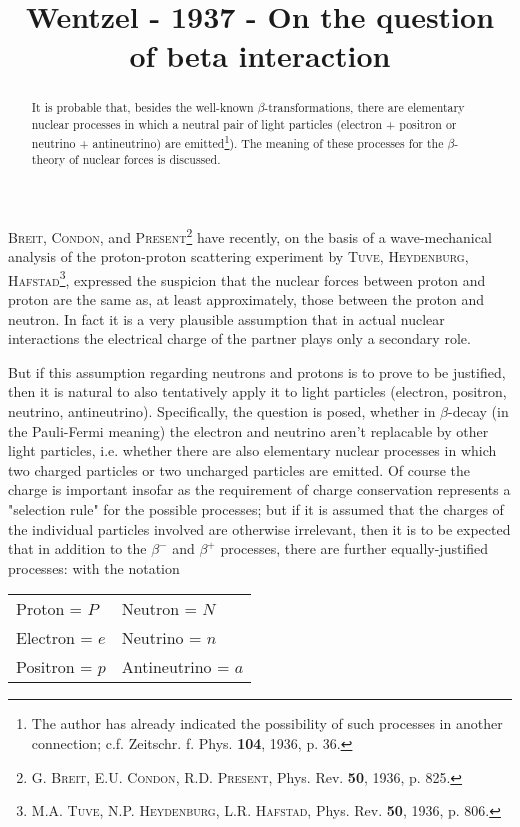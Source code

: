 \documentclass{article}
\title{Wentzel - 1937 - On the question of beta interaction}
\begin{document}
\begin{abstract}
It is probable that, besides the well-known $\beta$-transformations, there are elementary nuclear processes in which a neutral pair of light particles (electron + positron or neutrino + antineutrino) are emitted\footnote{The author has already indicated the possibility of such processes in another connection; c.f. Zeitschr. f. Phys. \textbf{104}, 1936, p. 36.}). The meaning of these processes for the $\beta$-theory of nuclear forces is discussed.
\end{abstract}

\textsc{Breit}, \textsc{Condon}, and \textsc{Present}\footnote{\textsc{G. Breit}, \textsc{E.U. Condon}, \textsc{R.D. Present}, Phys. Rev. \textbf{50}, 1936, p. 825.} have recently, on the basis of a wave-mechanical analysis of the proton-proton scattering experiment by \textsc{Tuve}, \textsc{Heydenburg}, \textsc{Hafstad}\footnote{\textsc{M.A. Tuve}, \textsc{N.P. Heydenburg}, \textsc{L.R. Hafstad}, Phys. Rev. \textbf{50}, 1936, p. 806.}, expressed the suspicion that the nuclear forces between proton and proton are the same as, at least approximately, those between the proton and neutron. In fact it is a very plausible assumption that in actual nuclear interactions the electrical charge of the partner plays only a secondary role.

But if this assumption regarding neutrons and protons is to prove to be justified, then it is natural to also tentatively apply it to light particles (electron, positron, neutrino, antineutrino). Specifically, the question is posed, whether in $\beta$-decay (in the Pauli-Fermi meaning) the electron and neutrino aren't replacable by other light particles, i.e. whether there are also elementary nuclear processes in which two charged particles or two uncharged particles are emitted. Of course the charge is important insofar as the requirement of charge conservation represents a 
"selection rule" for the possible processes; but if it is assumed that the charges of the individual particles involved are otherwise irrelevant, then it is to be expected that in addition to the $\beta^-$ and $\beta^+$ processes, there are further equally-justified processes: with the notation

\begin{tabular}{ll}
Proton = $P$ & Neutron = $N$\\
Electron = $e$ & Neutrino = $n$ \\
Positron = $p$ & Antineutrino = $a$
\end{tabular}
\end{document}
